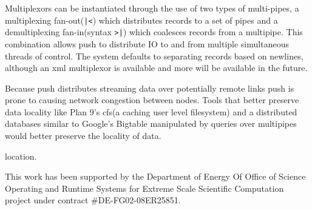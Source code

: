 \documentclass[11pt, letterpaper]{article}
\begin{document}
Multiplexors can be instantiated through the use of two types of multi-pipes, a multiplexing fan-out(\verb!|<!)  which distributes records to a set of pipes and a demultiplexing fan-in(syntax \verb!>|!) which coalesces records from a multipipe. This combination allows push to distribute IO to and from multiple simultaneous threads of control. The system defaults to separating records based on newlines, although an xml multiplexor is available and more will be available in the future. 

Because push distributes streaming data over potentially remote links push 
is prone to causing network congestion between nodes. Tools that better 
preserve data locality like Plan 9's cfs(a caching user level filesystem) 
and a distributed databases similar to Google's Bigtable\cite{chang2006bds} 
manipulated by queries over multipipes would better preserve the locality of data. 

location.

This work has been supported by the Department of Energy Of Office of Science Operating and Runtime Systems for Extreme Scale Scientific Computation project under contract \#DE-FG02-08ER25851. 



\end{document}
